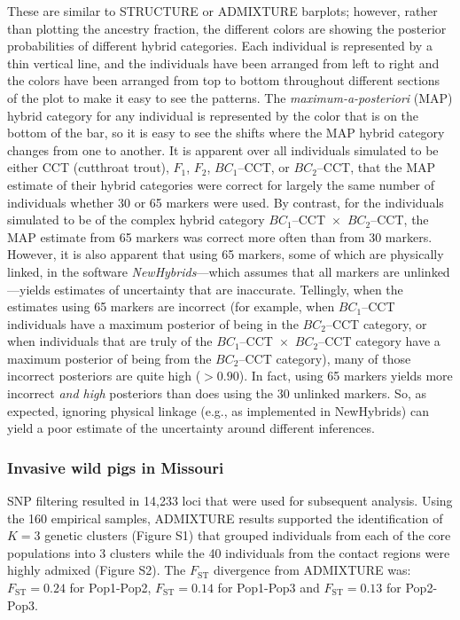 {\begin{figure}
\begin{center}
\end{center}
\caption[\nhbpcap]{\sometimes{\nhbpcap}}
\label{fig:newhyb-sims-barplot}
\end{figure}
These are similar to STRUCTURE or ADMIXTURE barplots;
however, rather than plotting the ancestry fraction, the different colors are showing the
posterior probabilities of different hybrid categories.  Each individual is represented by a thin
vertical line, and the individuals have been arranged from left to right and the colors have been
arranged from top to bottom throughout different sections of the plot to make it easy to see
the patterns.  The {\em maximum-a-posteriori} (MAP) hybrid category for any individual is represented
by the color that is on the bottom of the bar, so it is easy to see the shifts where the MAP hybrid
category changes from one to another.  It is apparent over all individuals simulated to be
either CCT (cutthroat trout), $F_1$, $F_2$, $BC_1$--CCT, or $BC_2$--CCT, that the MAP estimate of their
hybrid categories were correct for largely the same number of individuals whether 30 or 65 markers
were used. By contrast, for the individuals simulated to be of the complex hybrid category
$BC_1$--CCT~$\times$~$BC_2$--CCT, the MAP estimate from 65 markers was correct more often 
than from 
30 markers.  However, it is also apparent that using 65 markers, some of which are physically
linked, in the software {\em NewHybrids}---which assumes that all markers are unlinked---yields 
estimates of uncertainty that are inaccurate.  Tellingly, when the estimates using 65 markers are 
incorrect (for example, when $BC_1$--CCT individuals have a maximum posterior of being in the 
$BC_2$--CCT category,
or when individuals that are truly of the $BC_1$--CCT~$\times$~$BC_2$--CCT category have a
maximum posterior of being from the $BC_2$--CCT category), many of those incorrect posteriors
are quite high ($>0.90$).  In fact, using 65 markers yields more incorrect {\em and high} posteriors 
than does using the 30 unlinked markers. So, as expected, ignoring physical linkage (e.g., as 
implemented in {\sc NewHybrids}) 
can yield a poor estimate of the uncertainty around different inferences.

\subsubsection*{Invasive wild pigs in Missouri}

SNP filtering resulted in 14,233 loci that were used for subsequent analysis.
Using the 160 empirical samples, ADMIXTURE results supported the identification of
$K=3$ genetic clusters (Figure S1) that grouped individuals from each of the core populations into 3 clusters
while the 40 individuals from the contact regions were highly admixed (Figure S2). The
$F_\mathrm{ST}$ divergence from ADMIXTURE was:
$F_\mathrm{ST} = 0.24$ for Pop1-Pop2,
$F_\mathrm{ST} = 0.14$ for Pop1-Pop3 and
$F_\mathrm{ST} = 0.13$ for Pop2-Pop3.

}
